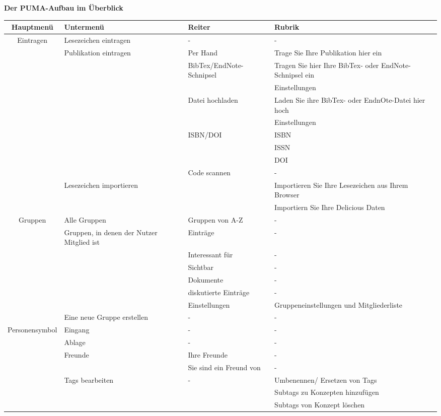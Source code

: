\textbf{Der PUMA-Aufbau im Überblick}
\small
\begin{longtable}{|c|m{3cm}|m{3cm}|m{3cm}|}\hline 
\bfseries Hauptmenü&\bfseries Untermenü&Reiter &\bfseries Rubrik\\  \hline
Eintragen&Lesezeichen eintragen &- &-\\ \cline{2-4}
&Publikation eintragen &Per Hand& Trage Sie Ihre Publikation hier ein\\\cline{3-4}
&&BibTex/EndNote-Schnipsel& Tragen Sie hier Ihre BibTex- oder EndNote-Schnipsel ein\\ \cline{4-4}
&&& Einstellungen\\ \cline{3-4}
&&Datei hochladen& Laden Sie ihre BibTex- oder EndnOte-Datei hier hoch\\ \cline{4-4}
&&&Einstellungen\\ \cline{3-4}
&&ISBN/DOI& ISBN\\ \cline{4-4}
&&& ISSN \\ \cline{4-4}
&&&DOI\\ \cline{3-4}
&&Code scannen&-\\ \cline{2-4}
&Lesezeichen importieren& &Importieren Sie Ihre Lesezeichen aus Ihrem Browser\\ \cline{4-4}
&& & Importiern Sie Ihre Delicious Daten\\ \hline 
Gruppen&Alle Gruppen& Gruppen von A-Z &-\\ \cline{2-4}
&Gruppen, in denen der Nutzer Mitglied ist& Einträge &-\\\cline{3-4}
&&Interessant für &- \\ \cline{3-4}
&&Sichtbar&-\\ \cline{3-4}
&&Dokumente&-\\ \cline{3-4}
&&diskutierte Einträge&-\\ \cline{3-4}
&&Einstellungen& Gruppeneinstellungen und Mitgliederliste\\ \cline{2-4}
&Eine neue Gruppe erstellen&-&-\\ \hline
Personensymbol&Eingang&-&-\\ \cline{2-4}
&Ablage&-&-\\ \cline{2-4}
&Freunde&Ihre Freunde&- \\ \cline{3-4}
&&Sie sind ein Freund von&- \\ \cline{2-4}
&Tags bearbeiten&-&Umbenennen/ Ersetzen von Tags\\ \cline{4-4}
&&&Subtags zu Konzepten hinzufügen\\ \cline{4-4}
&&&Subtags von Konzept löschen\\ \cline{2-4}

\end{longtable}
